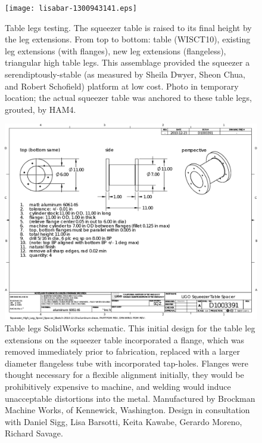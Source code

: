 \begin{figure}
\begin{center}
\texttt{[image: lisabar-1300943141.eps]}
\caption{Table legs testing. The squeezer table is raised to its final height by the leg extensions. From top to bottom: table (WISCT10), existing leg extensions (with flanges), new leg extensions (flangeless), triangular high table legs. This assemblage provided the squeezer a serendiptously-stable (as measured by Sheila Dwyer, Sheon Chua, and Robert Schofield) platform at low cost. Photo in temporary location; the actual squeezer table was anchored to these table legs, grouted, by HAM4.
}
\label{table_leg_testing}
\end{center}
\end{figure}




\begin{figure}
\begin{center}
\includegraphics[width=0.6\paperwidth]{Squeezer_High_Leg_Spool_Spacer_2010-12-23_aluminum.eps}
\caption{Table legs SolidWorks schematic. This initial design for the table leg extensions on the squeezer table incorporated a flange, which was removed immediately prior to fabrication, replaced with a larger diameter flangeless tube with incorporated tap-holes. Flanges were thought necessary for a flexible alignment initially, they would be prohibitively expensive to machine, and welding would induce unacceptable distortions into the metal. Manufactured by Brockman Machine Works, of Kennewick, Washington. Design in consultation with Daniel Sigg, Lisa Barsotti, Keita Kawabe, Gerardo Moreno, Richard Savage.
}
\label{spacer_legs_figure}
\end{center}
\end{figure}


